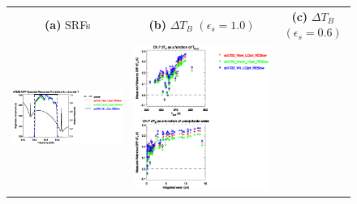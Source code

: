 \begin{figure}[H]
  \centering
  \begin{tabular}{c c c}
    \textsf{\textbf{(a)} SRFs} &
    \textsf{\textbf{(b)} $\Delta T_B$ $(\epsilon_s = 1.0)$} &
    \textsf{\textbf{(c)} $\Delta T_B$ $(\epsilon_s = 0.6)$} \\
    \includegraphics[bb=80 400 280 558,clip,scale=0.85]{graphics/srf/Vset/atms_npp.ch7.osrf.eps} &
    \includegraphics[bb=85 400 260 558,clip,scale=0.85]{graphics/dtb/Vset/e1.0_r0.0/atms_npp.ch7.dTb.eps} & 

\end{tabular}
\end{figure}
